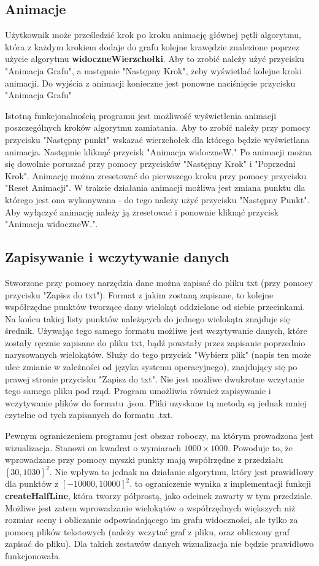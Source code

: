 \documentclass{article}
\begin{document}
\subsection{Animacje}
\qquad Użytkownik może prześledzić krok po kroku animację głównej pętli algorytmu, która z każdym krokiem dodaje do grafu kolejne krawędzie znalezione poprzez użycie algorytmu \textbf{widoczneWierzchołki}. Aby to zrobić należy użyć przycisku "Animacja Grafu", a następnie "Następny Krok", żeby wyświetlać kolejne kroki animacji. Do wyjścia z animacji konieczne jest ponowne naciśnięcie przycisku "Animacja Grafu"

\noindent \qquad Istotną funkcjonalnością programu jest możliwość wyświetlenia animacji poszczególnych kroków algorytmu zamiatania. Aby to zrobić należy przy pomocy przycisku "Następny punkt" wskazać wierzchołek dla którego będzie wyświetlana animacja. Następnie kliknąć przycisk "Animacja widoczneW." Po animacji można się dowolnie poruszać przy pomocy przycisków "Następny Krok" i "Poprzedni Krok". Animację można zresetować do pierwszego kroku przy pomocy przycisku "Reset Animacji". W trakcie działania animacji możliwa jest zmiana punktu dla którego jest ona wykonywana - do tego należy użyć przycisku "Następny Punkt". Aby wyłączyć animację należy ją zresetować i ponownie kliknąć przycisk "Animacja widoczneW.".


\subsection{Zapisywanie i wczytywanie danych}
\qquad Stworzone przy pomocy narzędzia dane można zapisać do pliku txt (przy pomocy przycisku "Zapisz do txt"). Format z jakim zostaną zapisane, to kolejne współrzędne punktów tworzące dany wielokąt oddzielone od siebie przecinkami. Na końcu takiej listy punktów należących do jednego wielokąta znajduje się średnik. Używając tego samego formatu możliwe jest wczytywanie danych, które zostały ręcznie zapisane do pliku txt, bądź powstały przez zapisanie poprzednio narysowanych wielokątów. Służy do tego przycisk "Wybierz plik" (napis ten może ulec zmianie w zależności od języka systemu operacyjnego), znajdujący się po prawej stronie przycisku "Zapisz do txt". Nie jest możliwe dwukrotne wczytanie tego samego pliku pod rząd. Program umożliwia również zapisywanie i wczytywanie plików do formatu .json. Pliki uzyskane tą metodą są jednak mniej czytelne od tych zapisanych do formatu .txt.

\noindent \qquad Pewnym ograniczeniem programu jest obszar roboczy, na którym prowadzona jest wizualizacja. Stanowi on kwadrat o wymiarach $1000\times1000$. Powoduje to, że wprowadzane przy pomocy myszki punkty mają współrzędne z przedziału $[30, 1030]^2$. Nie wpływa to jednak na działanie algorytmu, który jest prawidłowy dla punktów z  $[-10000, 10000]^2$. to ograniczenie wynika z implementacji funkcji \textbf{createHalfLine}, która tworzy półprostą, jako odcinek zawarty w tym przedziale. Możliwe jest zatem wprowadzanie wielokątów o współrzędnych większych niż rozmiar sceny i obliczanie odpowiadającego im grafu widoczności, ale tylko za pomocą plików tekstowych (należy wczytać graf z pliku, oraz obliczony graf zapisać do pliku). Dla takich zestawów danych wizualizacja nie będzie prawidłowo funkcjonowała.
\end{document}
